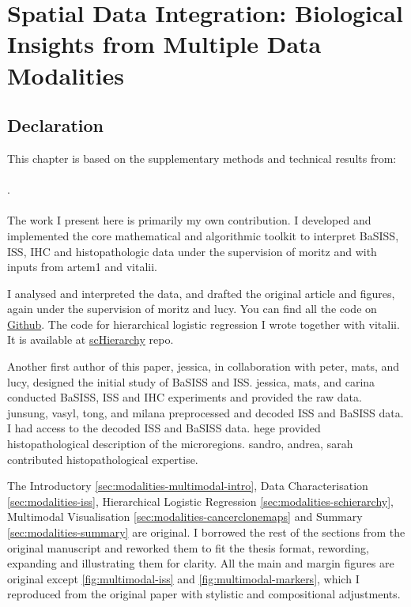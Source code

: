 \chapter{Spatial Data Integration: Biological Insights from  Multiple Data Modalities}
\label{sec:chapter-basiss-multimodal}

\section*{Declaration}

This chapter is based on the supplementary methods and technical results from:
\\~\\
 . 
\\~\\
The work I present here is primarily my own contribution. I developed and implemented the core mathematical and algorithmic toolkit to interpret \acs{BaSISS}, \acs{ISS}, \acs{IHC} and histopathologic data under the supervision of \ac{moritz} and with inputs from \ac{artem1} and \ac{vitalii}. 

I analysed and interpreted the data, and drafted the original article and figures, again under the supervision of \ac{moritz} and \ac{lucy}. You can find all the code on \href{https://github.com/gerstung-lab/BaSISS}{Github}. The code for hierarchical logistic regression I wrote together with \ac{vitalii}. It is available at \href{https://github.com/dissatisfaction-ai/scHierarchy}{scHierarchy} repo.

Another first author of this paper, \ac{jessica}, in collaboration with \ac{peter}, \ac{mats}, and \ac{lucy}, designed the initial study of \acs{BaSISS} and \acs{ISS}. \ac{jessica}, \ac{mats}, and \ac{carina} conducted \acs{BaSISS}, \acs{ISS} and \acs{IHC} experiments and provided the raw data. \ac{junsung}, \ac{vasyl}, \ac{tong}, and \ac{milana} preprocessed and decoded \acs{ISS} and \acs{BaSISS} data. I had access to the decoded \acs{ISS} and \acs{BaSISS} data. \ac{hege} provided histopathological description of the microregions. \ac{sandro}, \ac{andrea}, \ac{sarah} contributed histopathological expertise.

The Introductory \cref{sec:modalities-multimodal-intro}, Data Characterisation \cref{sec:modalities-iss}, Hierarchical Logistic Regression \cref{sec:modalities-schierarchy}, Multimodal Visualisation \cref{sec:modalities-cancerclonemaps} and Summary \cref{sec:modalities-summary} are original. I borrowed the rest of the sections from the original manuscript and reworked them to fit the thesis format, rewording, expanding and illustrating them for clarity. All the main and margin figures are original except \cref{fig:multimodal-iss} and \cref{fig:multimodal-markers}, which I reproduced from the original paper with stylistic and compositional adjustments. 


